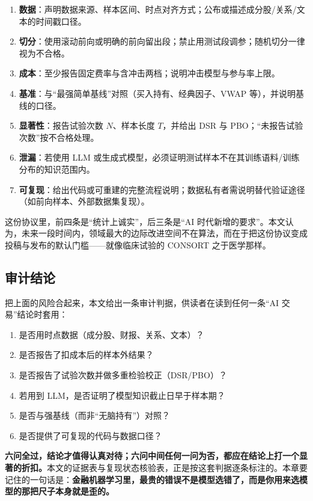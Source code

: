 \begin{enumerate}
  \item \textbf{数据}：声明数据来源、样本区间、时点对齐方式；公布或描述成分股/关系/文本的时间戳口径。
  \item \textbf{切分}：使用滚动前向或明确的前向留出段；禁止用测试段调参；随机切分一律视为不合格。
  \item \textbf{成本}：至少报告固定费率与含冲击两档；说明冲击模型与参与率上限。
  \item \textbf{基准}：与“最强简单基线”对照（买入持有、经典因子、VWAP 等），并说明基线的口径。
  \item \textbf{显著性}：报告试验次数 $N$、样本长度 $T$，并给出 DSR 与 PBO；“未报告试验次数”按不合格处理。
  \item \textbf{泄漏}：若使用 LLM 或生成式模型，必须证明测试样本不在其训练语料/训练分布的知识范围内。
  \item \textbf{可复现}：给出代码或可重建的完整流程说明；数据私有者需说明替代验证途径（如前向样本、外部数据集复现）。
\end{enumerate}

这份协议里，前四条是“统计上诚实”，后三条是“AI 时代新增的要求”。本文认为，未来一段时间内，领域最大的边际改进空间不在算法，而在于把这份协议变成投稿与发布的默认门槛——就像临床试验的 CONSORT 之于医学那样。

\subsection{审计结论}

把上面的风险合起来，本文给出一条审计判据，供读者在读到任何一条“AI 交易”结论时套用：

\begin{enumerate}
  \item 是否用时点数据（成分股、财报、关系、文本）？
  \item 是否报告了扣成本后的样本外结果？
  \item 是否报告了试验次数并做多重检验校正（DSR/PBO）？
  \item 若用到 LLM，是否证明了模型知识截止日早于样本期？
  \item 是否与强基线（而非“无脑持有”）对照？
  \item 是否提供了可复现的代码与数据口径？
\end{enumerate}

\textbf{六问全过，结论才值得认真对待；六问中间任何一问为否，都应在结论上打一个显著的折扣。}本文的证据表与复现状态核验表，正是按这套判据逐条标注的。本章要记住的一句话是：\textbf{金融机器学习里，最贵的错误不是模型选错了，而是你用来选模型的那把尺子本身就是歪的。}
